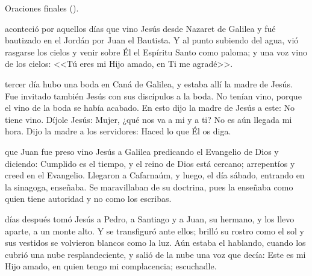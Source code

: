 \documentclass[10pt,oneside]{book}
\begin{document}
\begin{center}
      {}
      Oraciones finales ().
\end{center}

aconteció por aquellos días que vino Jesús desde Nazaret de Galilea y fué bautizado en el Jordán por Juan el Bautista.
Y al punto subiendo del agua, vió rasgarse los cielos y venir sobre Él el Espíritu Santo como paloma; y una voz vino de los cielos: 
<<Tú eres mi Hijo amado, en Ti me agradé>>.\\[2mm]

\vspace{5mm}

 tercer día hubo una boda en Caná de Galilea, y estaba allí la madre de Jesús. Fue invitado también Jesús con sus discípulos a la boda.
No tenían vino, porque el vino de la boda se había acabado. En esto dijo la madre de Jesús a este: No tiene vino. Díjole Jesús: Mujer,
¿qué nos va a mi y a ti? No es aún llegada mi hora. Dijo la madre a los servidores: Haced lo que Él os diga. 

\begin{center}
      
\end{center}

 que Juan fue preso vino Jesús a Galilea predicando el Evangelio de Dios y diciendo: Cumplido es el tiempo, y el reino de Dios está cercano;
arrepentíos y creed en el Evangelio. Llegaron a Cafarnaúm, y luego, el día sábado, entrando en la sinagoga, enseñaba. Se maravillaban de su doctrina,
pues la enseñaba como quien tiene autoridad y no como los escribas.

\begin{center}
      
\end{center}

 días después tomó Jesús a Pedro, a Santiago y a Juan, su hermano, y los llevo aparte, a un monte alto. Y se transfiguró ante ellos;
brilló su rostro como el sol y sus vestidos se volvieron blancos como la luz. Aún estaba el hablando, cuando los cubrió una nube resplandeciente,
y salió de la nube una voz que decía: Este es mi Hijo amado, en quien tengo mi complacencia; escuchadle.
\end{document}
